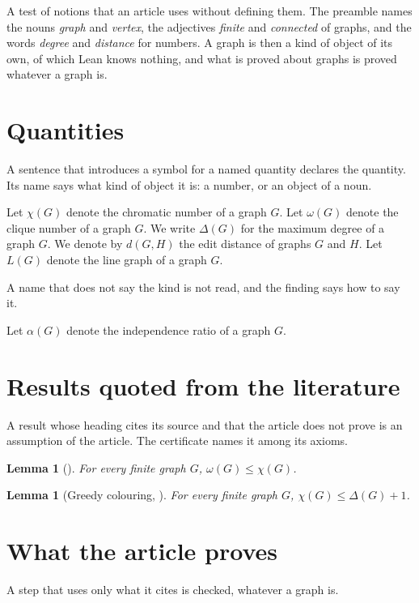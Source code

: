 \documentclass{article}
\newtheorem{lemma}[theorem]{Lemma}
\begin{document}
A test of notions that an article uses without defining them. The preamble names the
nouns \emph{graph} and \emph{vertex}, the adjectives \emph{finite} and \emph{connected} of
graphs, and the words \emph{degree} and \emph{distance} for numbers. A graph is then a kind of object of its
own, of which Lean knows nothing, and what is proved about graphs is proved whatever a
graph is.

\section{Quantities}

A sentence that introduces a symbol for a named quantity declares the quantity. Its name
says what kind of object it is: a number, or an object of a noun.

Let $\chi(G)$ denote the chromatic number of a graph $G$.
Let $\omega(G)$ denote the clique number of a graph $G$.
We write $\Delta(G)$ for the maximum degree of a graph $G$.
We denote by $d(G,H)$ the edit distance of graphs $G$ and $H$.
Let $L(G)$ denote the line graph of a graph $G$.

A name that does not say the kind is not read, and the finding says how to say it.

Let $\alpha(G)$ denote the independence ratio of a graph $G$.

\section{Results quoted from the literature}

A result whose heading cites its source and that the article does not prove is an
assumption of the article. The certificate names it among its axioms.

\begin{lemma}[{\cite[Section~5.1]{diestel}}]\label{clique}
For every finite graph $G$, $\omega(G)\le\chi(G)$.
\end{lemma}

\begin{lemma}[Greedy colouring, \cite{diestel}]\label{greedy}
For every finite graph $G$, $\chi(G)\le\Delta(G)+1$.
\end{lemma}

\section{What the article proves}

A step that uses only what it cites is checked, whatever a graph is.
\end{document}
